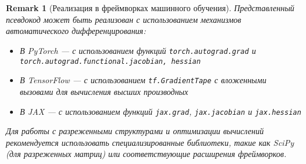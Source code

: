 \documentclass[11pt]{article}
\newtheorem{remark}{Remark}
\begin{document}
\\
\\

\begin{remark}[Реализация в фреймворках машинного обучения]
  Представленный псевдокод может быть реализован с использованием механизмов автоматического дифференцирования:
  \begin{itemize}
    \item В PyTorch — с использованием функций \texttt{torch.autograd.grad} и
      \texttt{torch.autograd.functional.jacobian, hessian}
    \item В TensorFlow — с использованием \texttt{tf.GradientTape} с вложенными вызовами для вычисления
      высших производных
    \item В JAX — с использованием функций \texttt{jax.grad}, \texttt{jax.jacobian} и \texttt{jax.hessian}
  \end{itemize}
  Для работы с разреженными структурами и оптимизации вычислений рекомендуется использовать
  специализированные библиотеки, такие как SciPy (для разреженных матриц) или соответствующие расширения фреймворков.
\end{remark}
\end{document}
